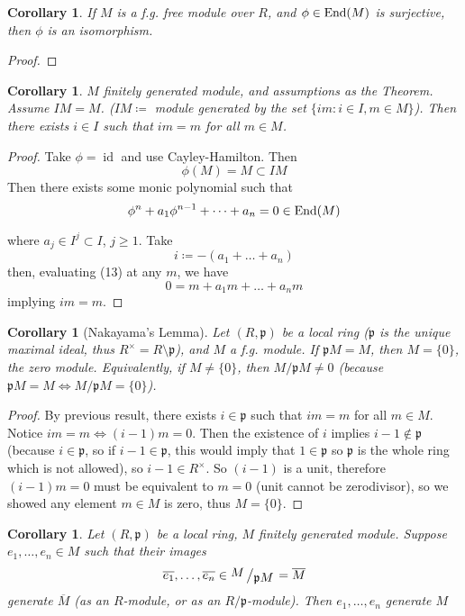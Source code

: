 \documentclass[12pt]{article}
\newcommand{\ita}[1]{\textit{#1}}
\newcommand{\en}[1]{\textup{End}(#1)}
\DeclareMathOperator{\id}{id}
\newcommand{\bigslant}[2]{{\raisebox{.2em}{$#1$}\left/\raisebox{-.2em}{$#2$}\right.}}
\newcommand\en{\ita{n }}
\def\p{\mathfrak{p}}
\newtheorem{corollary}[theorem]{Corollary}
\theoremstyle{definition}
\begin{document}
\begin{corollary}
If $M$ is a f.g. free module over $R$, and $\phi \in \en{M}$ is surjective, then $\phi$ is an isomorphism.
\end{corollary}
\begin{proof}

\end{proof}
\date{30.10.2018}
\begin{corollary}
$M$ finitely generated module, and assumptions as the Theorem. Assume $IM = M$. ($IM\coloneqq$ module generated by the set $\{im:i\in I,m\in M\}$). Then there exists $i\in I$ such that $im = m$ for all $m\in M$. 
\end{corollary}
\begin{proof}
Take $\phi = \id$ and use Cayley-Hamilton. Then
\[
\phi(M) = M \subset IM 
\]
Then there exists some monic polynomial such that
\begin{equation}
 \phi^n + a_1\phi^{n-1}+\dots + a_n = 0 \in \en{M}   
\end{equation}

where $a_j\in I^j\subset I$, $j\geq 1$. Take
\[
i \coloneqq -(a_1+\dots +a_n)
\]
then, evaluating (13) at any $m$, we have
\[
0 = m+a_1m+\dots+a_nm
\]
implying $im = m$.
\end{proof}
\begin{corollary}[Nakayama's Lemma]
Let $(R,\p)$ be a local ring ($\p$ is the unique maximal ideal, thus $R^\times = R\setminus \p$), and $M$ a f.g. module. If $\p M = M$, then $M =\{0\}$, the zero module. Equivalently, if $M\neq \{0\}$, then $M/\p M \neq 0$ (because $\p M=M \iff M/\p M =\{0\}$).
\end{corollary}
\begin{proof}
By previous result, there exists $i\in \p$ such that $im =m$ for all $m\in M$. Notice $im=m \iff (i-1)m = 0$. Then the existence of $i$ implies $i-1\notin \p$ (because $i\in \p$, so if $i-1 \in \p$, this would imply that $1\in \p$ so $\p$ is the whole ring which is not allowed), so $i-1\in R^\times$. So $(i-1)$ is a unit, therefore $(i-1)m=0$ must be equivalent to $m=0$ (unit cannot be zerodivisor), so we showed any element $m\in M$ is zero, thus $M= \{0\}$.
\end{proof}
\begin{corollary}
Let $(R,\p)$ be a local ring, $M$ finitely generated module. Suppose $e_1,\dots,e_n \in M$ such that their images 
\[
\overline{e_1},\dots, \overline{e_n} \in \bigslant{M}{\p M} = \overline{M}
\]
generate $\overline{M}$ (as an $R$-module, or as an $R/\p$-module). Then $e_1, \dots ,e_n$ generate $M$
\end{corollary}
\end{document}
